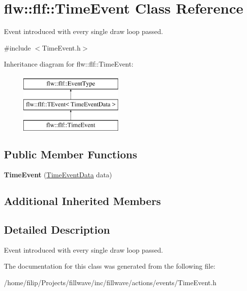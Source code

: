 \hypertarget{classflw_1_1flf_1_1TimeEvent}{}\section{flw\+:\+:flf\+:\+:Time\+Event Class Reference}
\label{classflw_1_1flf_1_1TimeEvent}


Event introduced with every single draw loop passed.  




{\ttfamily \#include $<$Time\+Event.\+h$>$}

Inheritance diagram for flw\+:\+:flf\+:\+:Time\+Event\+:\begin{figure}[H]
\begin{center}
\leavevmode
\includegraphics[height=3.000000cm]{classflw_1_1flf_1_1TimeEvent}
\end{center}
\end{figure}
\subsection*{Public Member Functions}
\begin{DoxyCompactItemize}
\item 
{\bfseries Time\+Event} (\hyperlink{structflw_1_1flf_1_1TimeEventData}{Time\+Event\+Data} data)\hypertarget{classflw_1_1flf_1_1TimeEvent_a9c83e68edcd9cf5b2e3a83657267a958}{}\label{classflw_1_1flf_1_1TimeEvent_a9c83e68edcd9cf5b2e3a83657267a958}

\end{DoxyCompactItemize}
\subsection*{Additional Inherited Members}


\subsection{Detailed Description}
Event introduced with every single draw loop passed. 

The documentation for this class was generated from the following file\+:\begin{DoxyCompactItemize}
\item 
/home/filip/\+Projects/fillwave/inc/fillwave/actions/events/Time\+Event.\+h\end{DoxyCompactItemize}

